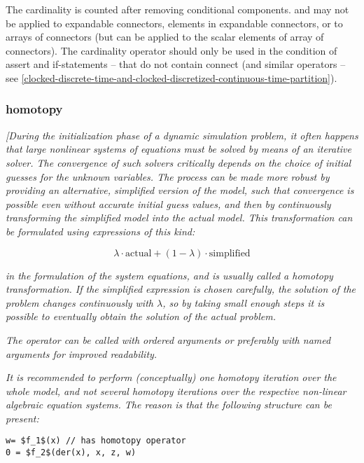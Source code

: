The cardinality is counted after removing conditional components. and
may not be applied to expandable connectors, elements in expandable
connectors, or to arrays of connectors (but can be applied to the scalar
elements of array of connectors). The cardinality operator should only
be used in the condition of assert and if-statements -- that do not
contain connect (and similar operators -- see \autoref{clocked-discrete-time-and-clocked-discretized-continuous-time-partition}).

\subsubsection{homotopy}

\emph{{[}During the initialization phase of a dynamic simulation
problem, it often happens that large nonlinear systems of equations must
be solved by means of an iterative solver. The convergence of such
solvers critically depends on the choice of initial guesses for the
unknown variables. The process can be made more robust by providing an
alternative, simplified version of the model, such that convergence is
possible even without accurate initial guess values, and then by
continuously transforming the simplified model into the actual model.
This transformation can be formulated using expressions of this kind:}

$$\lambda\cdot\text{actual} + (1-\lambda)\cdot\text{simplified}$$

\emph{in the formulation of the system equations, and is usually called
a homotopy transformation. If the simplified expression is chosen
carefully, the solution of the problem changes continuously with $\lambda$,
so by taking small enough steps it is possible to eventually obtain the
solution of the actual problem.}

\emph{The operator can be called with ordered arguments or preferably
with named arguments for improved readability.}

\emph{It is recommended to perform (conceptually) one homotopy iteration
over the whole model, and not several homotopy iterations over the
respective non-linear algebraic equation systems. The reason is that the
following structure can be present:}

\begin{lstlisting}[language=modelica, mathescape=true]
w= $f_1$(x) // has homotopy operator
0 = $f_2$(der(x), x, z, w)
\end{lstlisting}

